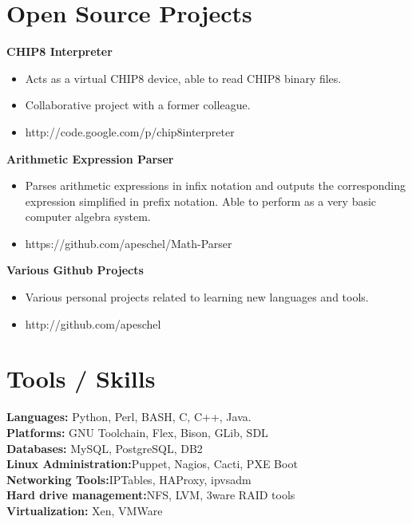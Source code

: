 \documentclass[10pt,line,margin,letterpaper]{res}
\begin{document}
\address{4245 Stanley Blvd. Apt. 6, Pleasanton, CA}
\address{aaron.peschel@gmail.com or (760)-791-7301}

\begin{resume}
\pagestyle{empty}
\section {Open Source Projects}
    {\bf CHIP8 Interpreter}
    \begin{itemize} \itemsep -2pt
    \item Acts as a virtual CHIP8 device, able to read CHIP8 binary files.
    \item Collaborative project with a former colleague.
    \item http://code.google.com/p/chip8interpreter
    \end{itemize}

    {\bf Arithmetic Expression Parser}
    \begin{itemize} \itemsep -2pt
    \item Parses arithmetic expressions in infix notation and outputs the corresponding expression simplified in prefix notation. Able to perform as a very basic computer algebra system.
    \item https://github.com/apeschel/Math-Parser
    \end{itemize}

    {\bf Various Github Projects}
    \begin{itemize} \itemsep -2pt
    \item Various personal projects related to learning new languages and tools.
    \item http://github.com/apeschel
    \end{itemize}

\section{Tools / Skills}
    {\bf Languages:} Python, Perl, BASH, C, C++, Java. \\
    {\bf Platforms:} GNU Toolchain, Flex, Bison, GLib, SDL \\
    {\bf Databases:} MySQL, PostgreSQL, DB2 \\
    {\bf Linux Administration:}Puppet, Nagios, Cacti, PXE Boot \\
    {\bf Networking Tools:}IPTables, HAProxy, ipvsadm \\
    {\bf Hard drive management:}NFS, LVM, 3ware RAID tools \\
    {\bf Virtualization:} Xen, VMWare \\


\end{resume}
\end{document}
